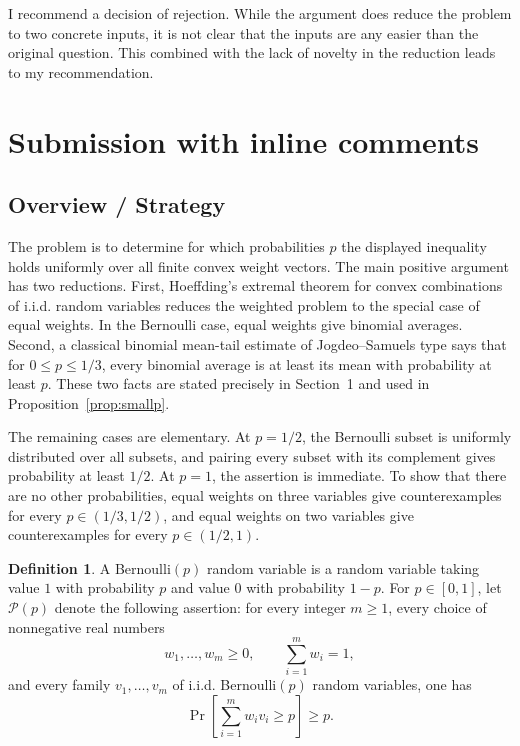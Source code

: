 \documentclass[12pt]{article}
\theoremstyle{definition}
\newtheorem{definition}{Definition}
\theoremstyle{plain}
\theoremstyle{remark}
\begin{document}
  I recommend a decision of rejection. While the argument does reduce the problem to two concrete inputs, it is not clear that the inputs are any easier than the original question. This combined with the lack of novelty in the reduction leads to my recommendation.

  \section{Submission with inline comments}


\date{}

\subsection*{Overview / Strategy}

The problem is to determine for which probabilities \(p\) the displayed inequality holds uniformly over all finite convex weight vectors. The main positive argument has two reductions. First, Hoeffding's extremal theorem for convex combinations of i.i.d. random variables reduces the weighted problem to the special case of equal weights. In the Bernoulli case, equal weights give binomial averages. Second, a classical binomial mean-tail estimate of Jogdeo--Samuels type says that for \(0\le p\le 1/3\), every binomial average is at least its mean with probability at least \(p\). These two facts are stated precisely in Section~1 and used in Proposition~\ref{prop:smallp}.

The remaining cases are elementary. At \(p=1/2\), the Bernoulli subset is uniformly distributed over all subsets, and pairing every subset with its complement gives probability at least \(1/2\). At \(p=1\), the assertion is immediate. To show that there are no other probabilities, equal weights on three variables give counterexamples for every \(p\in(1/3,1/2)\), and equal weights on two variables give counterexamples for every \(p\in(1/2,1)\).

\begin{definition}
A Bernoulli\((p)\) random variable is a random variable taking value \(1\) with probability \(p\) and value \(0\) with probability \(1-p\). For \(p\in[0,1]\), let \(\mathcal P(p)\) denote the following assertion:
for every integer \(m\ge1\), every choice of nonnegative real numbers
\[
w_1,\ldots,w_m\ge0,\qquad \sum_{i=1}^{m}w_i=1,
\]
and every family \(v_1,\ldots,v_m\) of i.i.d. Bernoulli\((p)\) random variables, one has
\[
\Pr\!\left[\sum_{i=1}^{m}w_i v_i\ge p\right]\ge p.
\]
\end{definition}
\end{document}
